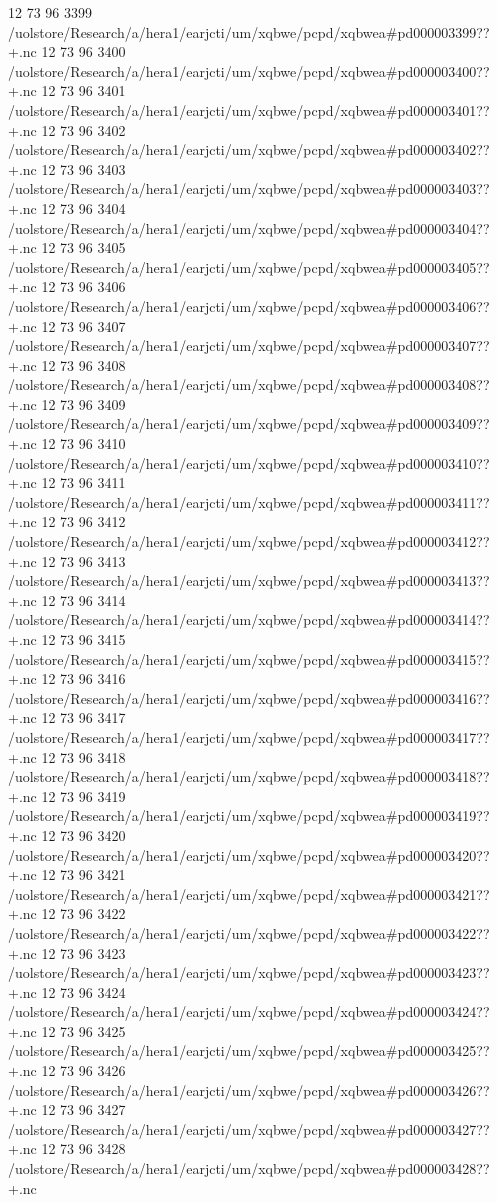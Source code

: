 12 73 96
3399
/uolstore/Research/a/hera1/earjcti/um/xqbwe/pcpd/xqbwea#pd000003399??+.nc
12 73 96
3400
/uolstore/Research/a/hera1/earjcti/um/xqbwe/pcpd/xqbwea#pd000003400??+.nc
12 73 96
3401
/uolstore/Research/a/hera1/earjcti/um/xqbwe/pcpd/xqbwea#pd000003401??+.nc
12 73 96
3402
/uolstore/Research/a/hera1/earjcti/um/xqbwe/pcpd/xqbwea#pd000003402??+.nc
12 73 96
3403
/uolstore/Research/a/hera1/earjcti/um/xqbwe/pcpd/xqbwea#pd000003403??+.nc
12 73 96
3404
/uolstore/Research/a/hera1/earjcti/um/xqbwe/pcpd/xqbwea#pd000003404??+.nc
12 73 96
3405
/uolstore/Research/a/hera1/earjcti/um/xqbwe/pcpd/xqbwea#pd000003405??+.nc
12 73 96
3406
/uolstore/Research/a/hera1/earjcti/um/xqbwe/pcpd/xqbwea#pd000003406??+.nc
12 73 96
3407
/uolstore/Research/a/hera1/earjcti/um/xqbwe/pcpd/xqbwea#pd000003407??+.nc
12 73 96
3408
/uolstore/Research/a/hera1/earjcti/um/xqbwe/pcpd/xqbwea#pd000003408??+.nc
12 73 96
3409
/uolstore/Research/a/hera1/earjcti/um/xqbwe/pcpd/xqbwea#pd000003409??+.nc
12 73 96
3410
/uolstore/Research/a/hera1/earjcti/um/xqbwe/pcpd/xqbwea#pd000003410??+.nc
12 73 96
3411
/uolstore/Research/a/hera1/earjcti/um/xqbwe/pcpd/xqbwea#pd000003411??+.nc
12 73 96
3412
/uolstore/Research/a/hera1/earjcti/um/xqbwe/pcpd/xqbwea#pd000003412??+.nc
12 73 96
3413
/uolstore/Research/a/hera1/earjcti/um/xqbwe/pcpd/xqbwea#pd000003413??+.nc
12 73 96
3414
/uolstore/Research/a/hera1/earjcti/um/xqbwe/pcpd/xqbwea#pd000003414??+.nc
12 73 96
3415
/uolstore/Research/a/hera1/earjcti/um/xqbwe/pcpd/xqbwea#pd000003415??+.nc
12 73 96
3416
/uolstore/Research/a/hera1/earjcti/um/xqbwe/pcpd/xqbwea#pd000003416??+.nc
12 73 96
3417
/uolstore/Research/a/hera1/earjcti/um/xqbwe/pcpd/xqbwea#pd000003417??+.nc
12 73 96
3418
/uolstore/Research/a/hera1/earjcti/um/xqbwe/pcpd/xqbwea#pd000003418??+.nc
12 73 96
3419
/uolstore/Research/a/hera1/earjcti/um/xqbwe/pcpd/xqbwea#pd000003419??+.nc
12 73 96
3420
/uolstore/Research/a/hera1/earjcti/um/xqbwe/pcpd/xqbwea#pd000003420??+.nc
12 73 96
3421
/uolstore/Research/a/hera1/earjcti/um/xqbwe/pcpd/xqbwea#pd000003421??+.nc
12 73 96
3422
/uolstore/Research/a/hera1/earjcti/um/xqbwe/pcpd/xqbwea#pd000003422??+.nc
12 73 96
3423
/uolstore/Research/a/hera1/earjcti/um/xqbwe/pcpd/xqbwea#pd000003423??+.nc
12 73 96
3424
/uolstore/Research/a/hera1/earjcti/um/xqbwe/pcpd/xqbwea#pd000003424??+.nc
12 73 96
3425
/uolstore/Research/a/hera1/earjcti/um/xqbwe/pcpd/xqbwea#pd000003425??+.nc
12 73 96
3426
/uolstore/Research/a/hera1/earjcti/um/xqbwe/pcpd/xqbwea#pd000003426??+.nc
12 73 96
3427
/uolstore/Research/a/hera1/earjcti/um/xqbwe/pcpd/xqbwea#pd000003427??+.nc
12 73 96
3428
/uolstore/Research/a/hera1/earjcti/um/xqbwe/pcpd/xqbwea#pd000003428??+.nc
